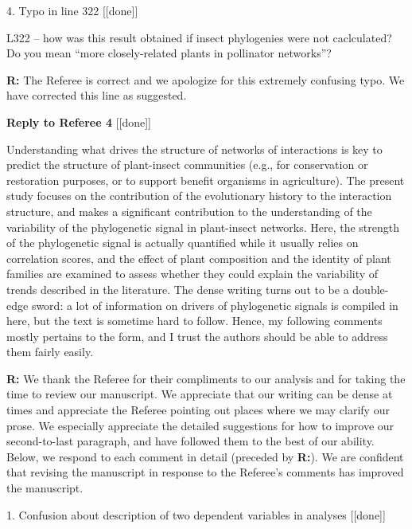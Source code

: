 \documentclass[12pt]{letter}
\newenvironment{refquote}{\bigskip \begin{it}}{\end{it}\smallskip}
\begin{document}
	4. Typo in line 322 [[done]]
		
		\begin{refquote}
			L322 – how was this result obtained if insect phylogenies were not caclculated? Do you mean “more closely-related plants in pollinator networks”?
		\end{refquote}


		\textbf{R:} The Referee is correct and we apologize for this extremely confusing typo. We have corrected this line as suggested.


\clearpage


{\Large \bf Reply to Referee 4} [[done]]

	\begin{refquote}
		Understanding what drives the structure of networks of interactions is key to predict the structure of plant-insect communities (e.g., for conservation or restoration purposes, or to support benefit organisms in agriculture).
		The present study focuses on the contribution of the evolutionary history to the interaction structure, and makes a significant contribution to the understanding of the variability of the phylogenetic signal in plant-insect networks. Here, the strength of the phylogenetic signal is actually quantified while it usually relies on correlation scores, and the effect of plant composition and the identity of plant families are examined to assess whether they could explain the variability of trends described in the literature.
		The dense writing turns out to be a double-edge sword: a lot of information on drivers of phylogenetic signals is compiled in here, but the text is sometime hard to follow. Hence, my following comments mostly pertains to the form, and I trust the authors should be able to address them fairly easily.
	\end{refquote}


	\textbf{R:} We thank the Referee for their compliments to our analysis and for taking the time to review our manuscript. We appreciate that our writing can be dense at times and appreciate the Referee pointing out places where we may clarify our prose. We especially appreciate the detailed suggestions for how to improve our second-to-last paragraph, and have followed them to the best of our ability. Below, we respond to each comment in detail (preceded by \textbf{R:}). We are confident that revising the manuscript in response to the Referee's comments has improved the manuscript.


	1. Confusion about description of two dependent variables in analyses [[done]]
\end{document}
